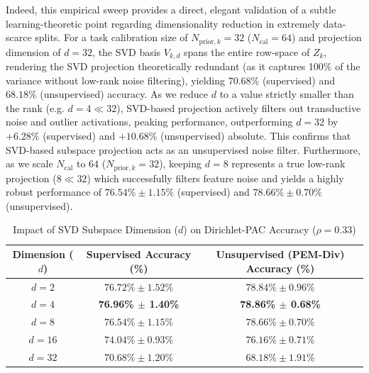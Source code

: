 Indeed, this empirical sweep provides a direct, elegant validation of a subtle learning-theoretic point regarding dimensionality reduction in extremely data-scarce splits. For a task calibration size of $N_{\text{prior}, k} = 32$ ($N_{\text{cal}} = 64$) and projection dimension of $d=32$, the SVD basis $V_{k, d}$ spans the entire row-space of $Z_k$, rendering the SVD projection theoretically redundant (as it captures 100\% of the variance without low-rank noise filtering), yielding $70.68\%$ (supervised) and $68.18\%$ (unsupervised) accuracy. As we reduce $d$ to a value strictly smaller than the rank (e.g. $d=4 \ll 32$), SVD-based projection actively filters out transductive noise and outlier activations, peaking performance, outperforming $d=32$ by $+6.28\%$ (supervised) and $+10.68\%$ (unsupervised) absolute. This confirms that SVD-based subspace projection acts as an unsupervised noise filter. Furthermore, as we scale $N_{\text{cal}}$ to $64$ ($N_{\text{prior}, k} = 32$), keeping $d=8$ represents a true low-rank projection ($8 \ll 32$) which successfully filters feature noise and yields a highly robust performance of $76.54\% \pm 1.15\%$ (supervised) and $78.66\% \pm 0.70\%$ (unsupervised).

\begin{table}[h]
\centering
\caption{Impact of SVD Subspace Dimension ($d$) on Dirichlet-PAC Accuracy ($\rho=0.33$)}
\label{tab:ablation_d}
\vskip 0.15in
\begin{tabular}{ccc}
\toprule
\textbf{Dimension ($d$)} & \textbf{Supervised Accuracy (\%)} & \textbf{Unsupervised (PEM-Div) Accuracy (\%)} \\
\midrule
$d = 2$ & $76.72\% \pm 1.52\%$ & $78.84\% \pm 0.96\%$ \\
$d = 4$ & \textbf{76.96\% $\pm$ 1.40\%} & \textbf{78.86\% $\pm$ 0.68\%} \\
$d = 8$ & $76.54\% \pm 1.15\%$ & $78.66\% \pm 0.70\%$ \\
$d = 16$ & $74.04\% \pm 0.93\%$ & $76.16\% \pm 0.71\%$ \\
$d = 32$ & $70.68\% \pm 1.20\%$ & $68.18\% \pm 1.91\%$ \\
\bottomrule
\end{tabular}
\end{table}

